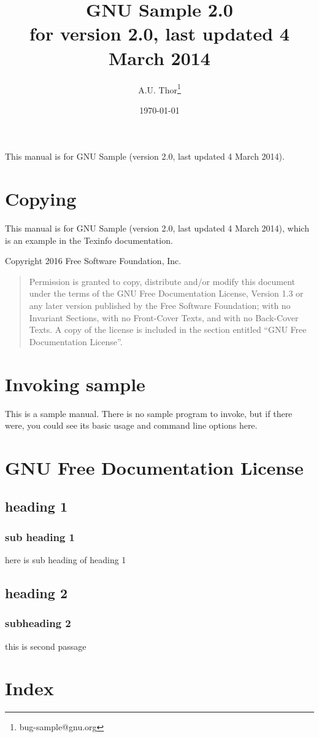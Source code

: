 \documentclass[11pt]{article}
\author{A.U. Thor\thanks{bug-sample@gnu.org}}
\date{\today}
\title{GNU Sample 2.0\\\medskip
\large for version 2.0, last updated 4 March 2014}
\begin{document}
\maketitle
\tableofcontents

This manual is for GNU Sample (version 2.0,
last updated 4 March 2014).

\section{Copying}
\label{sec:org8954c71}
This manual is for GNU Sample (version 2.0,
last updated 4 March 2014), which is an example in the Texinfo documentation.

Copyright \textcopyright{} 2016 Free Software Foundation, Inc.

\begin{quote}
Permission is granted to copy, distribute and/or modify this
document under the terms of the GNU Free Documentation License,
Version 1.3 or any later version published by the Free Software
Foundation; with no Invariant Sections, with no Front-Cover Texts,
and with no Back-Cover Texts.  A copy of the license is included in
the section entitled ``GNU Free Documentation License''.
\end{quote}

\section{Invoking sample}
\label{sec:orge8d05c8}

This is a sample manual.  There is no sample program to invoke, but
if there were, you could see its basic usage and command line
options here.

\section{GNU Free Documentation License}
\label{sec:orgb1d35f3}
\subsection{heading 1}
\label{sec:org3299f4c}
\subsubsection{sub heading 1}
\label{sec:org16522fd}
here is sub heading of heading 1
\subsection{heading 2}
\label{sec:orga7a800f}
\subsubsection{subheading 2}
\label{sec:org7c7ef38}
this is second passage

\section{Index}
\label{sec:org18e9ebd}
\end{document}

